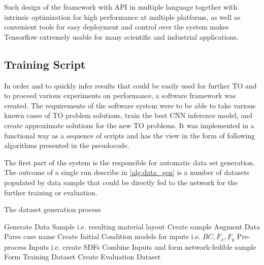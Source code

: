 Such design of the framework with API in multiple language together with intrinsic optimization for high performance at multiple platforms, as well as convenient tools for easy deployment and control over the system makes Tensorflow extremely usable for many scientific and industrial applications.

\subsection{Training Script}

In order and to quickly infer results that could be easily used for further TO and to proceed various experiments on performance, a software framework was created. 
The requirements of the software system were to be able to take various known cases of TO problem solutions, train the best CNN inference model, and create approximate solutions for the new TO problems.
It was implemented in a functional way as a sequence of scripts and has the view in the form of following algorithms presented in the pseudocode. 


The first part of the system is the responsible for automatic data set generation.
The outcome of a single run describe in \ref{alg:data_gen} is a number of datasets populated by data sample that could be directly fed to the network for the further training or evaluation.

\begin{algorithm}
\caption{The dataset generation process}\label{alg:data_gen}
\begin{algorithmic}[0]
	\State Generate Data Sample i.e. resulting material layout
	\State Create sample
	\EndFor
		\State Augment Data
		\State Parse case name
		\State Create Initial Condition models for inputs i.e. $BC,F_x,F_y$
		\State Pre-process Inputs i.e. create SDFs
		\State Combine Inputs and form network-fedible sample
	\EndFor
	\State Form Training Dataset
	\EndFor
	\State Create Evaluation Dataset
	
\end{algorithmic} 	
\end{algorithm}
\medskip
{}

